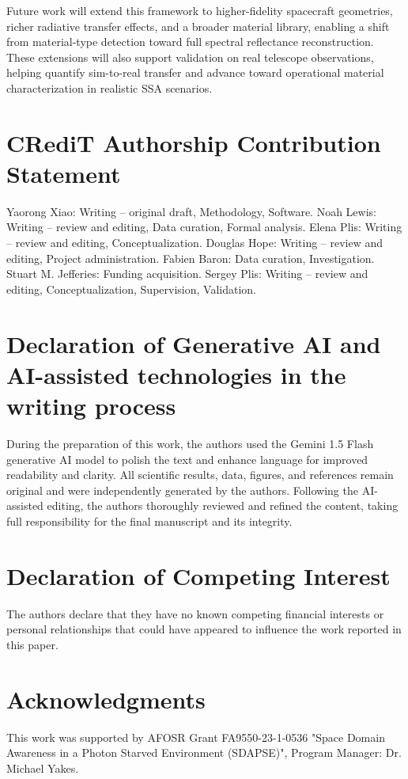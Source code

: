 \documentclass[12pt]{elsarticle}
\begin{document}
Future work will extend this framework to higher-fidelity spacecraft geometries, richer radiative transfer effects, and a broader material library, enabling a shift from material-type detection toward full spectral reflectance reconstruction. These extensions will also support validation on real telescope observations, helping quantify sim-to-real transfer and advance toward operational material characterization in realistic SSA scenarios.

\section*{CRediT Authorship Contribution Statement}
Yaorong Xiao: Writing – original draft, Methodology, Software. Noah Lewis: Writing – review and editing, Data curation, Formal analysis. Elena Plis: Writing – review and editing, Conceptualization. Douglas Hope: Writing – review and editing, Project administration. Fabien Baron: Data curation, Investigation. Stuart M. Jefferies: Funding acquisition. Sergey Plis: Writing – review and editing, Conceptualization, Supervision, Validation.

\section*{Declaration of Generative AI and AI-assisted technologies in the
writing process}

During the preparation of this work, the authors used the Gemini 1.5 Flash generative AI model to polish the text and enhance language for improved readability and clarity. All scientific results, data, figures, and references remain original and were independently generated by the authors. Following the AI-assisted editing, the authors thoroughly reviewed and refined the content, taking full responsibility for the final manuscript and its integrity.

\section*{Declaration of Competing Interest}
The authors declare that they have no known competing financial interests or  personal relationships that could have appeared to influence the work reported in this paper.

\section*{Acknowledgments}
This work was supported by  AFOSR Grant FA9550-23-1-0536 "Space Domain Awareness in a Photon Starved Environment (SDAPSE)", Program Manager: Dr. Michael Yakes.
\end{document}
